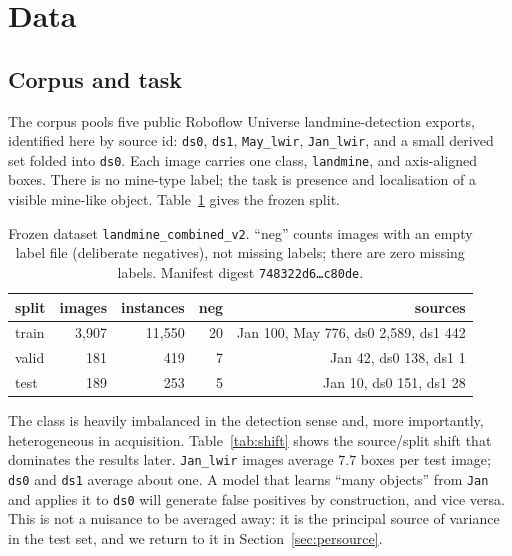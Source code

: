 \section{Data}
\label{sec:data}

\subsection{Corpus and task}

The corpus pools five public Roboflow Universe landmine-detection exports,
identified here by source id: \texttt{ds0}, \texttt{ds1}, \texttt{May\_lwir},
\texttt{Jan\_lwir}, and a small derived set folded into \texttt{ds0}. Each image
carries one class, \texttt{landmine}, and axis-aligned boxes. There is no
mine-type label; the task is presence and localisation of a visible
mine-like object. Table~\ref{tab:data} gives the frozen split.

\begin{table}[t]
\centering
\small
\caption{Frozen dataset \texttt{landmine\_combined\_v2}. ``neg'' counts images
with an empty label file (deliberate negatives), not missing labels; there are
zero missing labels. Manifest digest
\texttt{748322d6\ldots c80de}.}
\label{tab:data}
\begin{tabular}{lrrrr}
\toprule
split & images & instances & neg & sources \\
\midrule
train & 3{,}907 & 11{,}550 & 20 & Jan 100, May 776, ds0 2{,}589, ds1 442 \\
valid & 181 & 419 & 7 & Jan 42, ds0 138, ds1 1 \\
test & 189 & 253 & 5 & Jan 10, ds0 151, ds1 28 \\
\bottomrule
\end{tabular}
\end{table}

The class is heavily imbalanced in the detection sense and, more importantly,
heterogeneous in acquisition. Table~\ref{tab:shift} shows the source/split shift
that dominates the results later. \texttt{Jan\_lwir} images average $7.7$ boxes
per test image; \texttt{ds0} and \texttt{ds1} average about one. A model that
learns ``many objects'' from \texttt{Jan} and applies it to \texttt{ds0} will
generate false positives by construction, and vice versa. This is not a nuisance
to be averaged away: it is the principal source of variance in the test set, and
we return to it in Section~\ref{sec:persource}.

